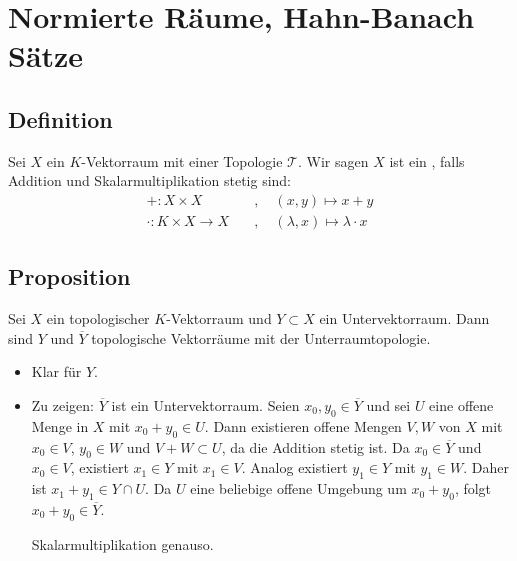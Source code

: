 \section{Normierte Räume, Hahn-Banach Sätze} %
\label{sec:2}

\subsection[Definition: Topologischer Vektorraum]{Definition} %
\label{sub:21}
Sei $X$ ein $K$-Vektorraum mit einer Topologie $\mathcal{T}$. Wir sagen $X$ ist ein , falls Addition und Skalarmultiplikation stetig sind:
\begin{align*}
	+ : X \times X \quad &, \quad(x,y) \mapsto x+y \\
	\cdot : K \times X \to X \quad &, \quad (\lambda ,x) \mapsto \lambda \cdot x
\end{align*}

\subsection[Proposition: Unterräume topologischer Vektorräume sind topologische Vektorräume]{Proposition} %
\label{sub:22}
Sei $X$ ein topologischer $K$-Vektorraum und $Y \subset X$ ein Untervektorraum. Dann sind $Y$ und $\overline{Y}$ topologische Vektorräume mit der Unterraumtopologie.
\begin{itemize}
	\item Klar für $Y$.
	\item Zu zeigen: $\overline{Y}$ ist ein Untervektorraum. Seien $x_0, y_0 \in \overline{Y}$ und sei $U$ eine offene Menge in $X$ mit $x_0 + y_0 \in U$. Dann existieren
	offene Mengen $V,W$ von $X$ mit $x_0 \in V$, $y_0 \in W$ und $V+W \subset U$, da die Addition stetig ist. Da $x_0 \in \overline{Y}$ und $x_0 \in V$, existiert 
	$x_1 \in Y$ mit $x_1 \in V$. Analog existiert $y_1 \in Y$ mit $y_1 \in W$. Daher ist $x_1 + y_1 \in Y \cap U$. Da $U$ eine beliebige offene Umgebung um $x_0+ y_0$,
	folgt $x_0 +y_0 \in \overline{Y}$.
	
	Skalarmultiplikation genauso. \bewende
\end{itemize}


